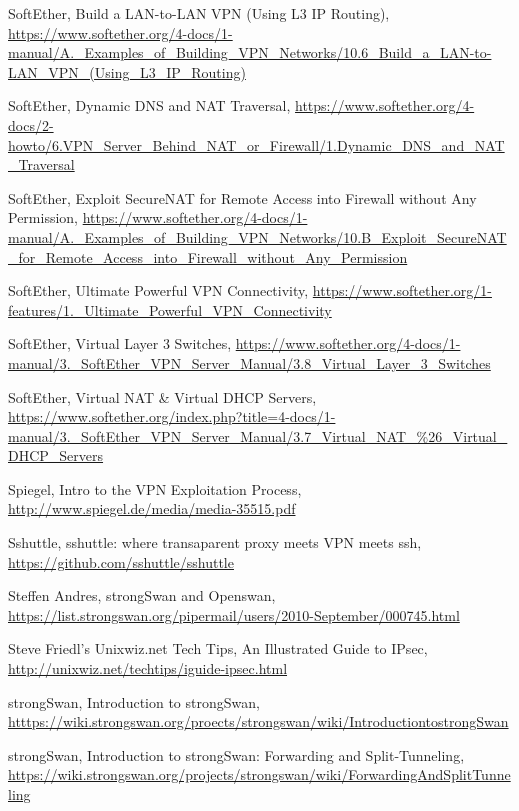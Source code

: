 \begin{thebibliography}{10}
  SoftEther, Build a LAN-to-LAN VPN (Using L3 IP Routing),
  \url{https://www.softether.org/4-docs/1-manual/A._Examples_of_Building_VPN_Networks/10.6_Build_a_LAN-to-LAN_VPN_(Using_L3_IP_Routing)}

  SoftEther, Dynamic DNS and NAT Traversal,
  \url{https://www.softether.org/4-docs/2-howto/6.VPN_Server_Behind_NAT_or_Firewall/1.Dynamic_DNS_and_NAT_Traversal}

  SoftEther, Exploit SecureNAT for Remote Access into Firewall without Any Permission,
  \url{https://www.softether.org/4-docs/1-manual/A._Examples_of_Building_VPN_Networks/10.B_Exploit_SecureNAT_for_Remote_Access_into_Firewall_without_Any_Permission}

  SoftEther, Ultimate Powerful VPN Connectivity,
  \url{https://www.softether.org/1-features/1._Ultimate_Powerful_VPN_Connectivity}

  SoftEther, Virtual Layer 3 Switches,
  \url{https://www.softether.org/4-docs/1-manual/3._SoftEther_VPN_Server_Manual/3.8_Virtual_Layer_3_Switches}

  SoftEther, Virtual NAT \& Virtual DHCP Servers,
  \url{https://www.softether.org/index.php?title=4-docs/1-manual/3._SoftEther_VPN_Server_Manual/3.7_Virtual_NAT_%26_Virtual_DHCP_Servers}

  Spiegel, Intro to the VPN Exploitation Process,
  \url{http://www.spiegel.de/media/media-35515.pdf}

  Sshuttle, sshuttle: where transaparent proxy meets VPN meets ssh,
  \url{https://github.com/sshuttle/sshuttle}

  Steffen Andres, strongSwan and Openswan,
  \url{https://list.strongswan.org/pipermail/users/2010-September/000745.html}

  Steve Friedl's Unixwiz.net Tech Tips, An Illustrated Guide to IPsec,
  \url{http://unixwiz.net/techtips/iguide-ipsec.html}

  strongSwan, Introduction to strongSwan,
  \url{htttps://wiki.strongswan.org/proects/strongswan/wiki/IntroductiontostrongSwan}

  strongSwan, Introduction to strongSwan: Forwarding and Split-Tunneling,
  \url{https://wiki.strongswan.org/projects/strongswan/wiki/ForwardingAndSplitTunneling}


\end{thebibliography}
